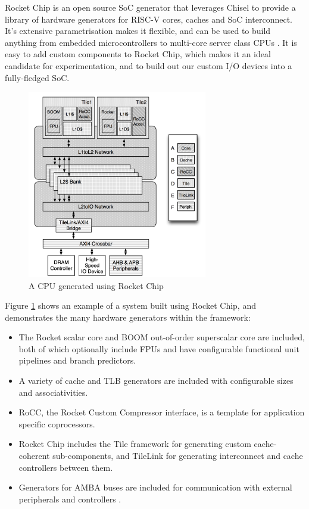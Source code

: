\documentclass[a4paper,fleqn,12pt]{article}
\begin{document}
Rocket Chip is an open source SoC generator that leverages Chisel to provide a library of hardware generators for RISC-V cores, caches and SoC interconnect. It's extensive parametrisation makes it flexible, and can be used to build anything from embedded microcontrollers to multi-core server class CPUs \citep{rocketchip}. It is easy to add custom components to Rocket Chip, which makes it an ideal candidate for experimentation, and to build out our custom I/O devices into a fully-fledged SoC.


\begin{figure}[h!]
    \centering
    \includegraphics[width=0.7\textwidth]{../img/rocket-chip.png}
    \caption{A CPU generated using Rocket Chip \citep{rocketchip}}
    \label{fig:rocket}
\end{figure}


Figure \ref{fig:rocket} shows an example of a system built using Rocket Chip, and demonstrates the many hardware generators within the framework:

\begin{itemize}
    \item The Rocket scalar core and BOOM out-of-order superscalar core are included, both of which optionally include FPUs and have configurable functional unit pipelines and branch predictors.
    \item A variety of cache and TLB generators are included with configurable sizes and associativities.
    \item RoCC, the Rocket Custom Compressor interface, is a template for application specific coprocessors.
    \item Rocket Chip includes the Tile framework for generating custom cache-coherent sub-components, and TileLink for generating interconnect and cache controllers between them.
    \item Generators for AMBA buses are included for communication with external peripherals and controllers \citep{axi}.
\end{itemize}
\end{document}
